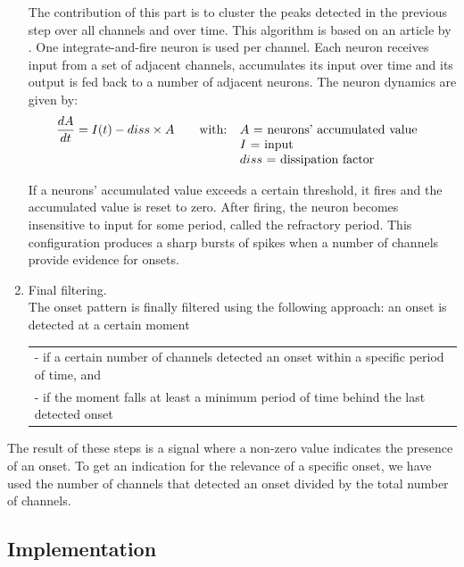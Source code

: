 \begin{enumerate}
    The contribution of this part is to cluster the peaks detected in the previous step over
    all channels and over time.
    This algorithm is based on an article by .
    One integrate-and-fire neuron is used per channel.
    Each neuron receives input from a set of
    adjacent channels, accumulates its input over time
    and its output is fed back to a number
    of adjacent neurons.
    The neuron dynamics are given by:
    \begin{displaymath}
    \frac{dA}{dt} = I(t) - diss\times{A} \qquad \textrm{with:
        \begin{tabular}[t]{l}
            $A$ = neurons' accumulated value \\
            $I$ = input \\
            $diss$ = dissipation factor
        \end{tabular}
        }
    \end{displaymath}

    If a neurons' accumulated value exceeds a certain threshold, it fires and the accumulated value
    is reset to zero. After firing, the neuron becomes insensitive to input for some period,
    called the refractory period. This configuration produces a sharp bursts of spikes when a
    number of channels provide evidence for onsets.
\item Final filtering.\\
    The onset pattern is finally filtered using the following approach:
    an onset is detected at a certain moment\\
    \begin{tabular}[t]{l}
        - if a certain number of channels detected an onset within
        a specific period of time, and\\
        - if the moment falls at least a minimum period of time
        behind the last detected onset\\
    \end{tabular}
\end{enumerate}

The result of these steps is a signal where a non-zero value
indicates the presence of an onset. To get an indication for the
relevance of a specific onset, we have used the number of
channels that detected an onset divided by the total number of
channels.

\subsection{Implementation}

